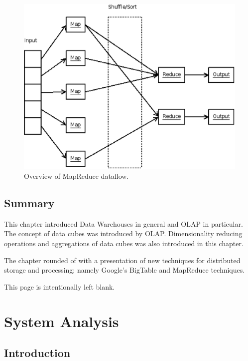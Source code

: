 \vspace{12pt}

\begin{figure}[h]
    \begin{center}
        \includegraphics[scale=0.50]{map-reduce.eps}
        \caption{Overview of MapReduce dataflow.}
    \end{center}
\end{figure}


\section*{Summary}

This chapter introduced Data Warehouses in general and OLAP in particular. The
concept of data cubes was introduced by OLAP. Dimensionality reducing operations
and aggregations of data cubes was also introduced in this chapter.

The chapter rounded of with a presentation of new techniques for distributed
storage and processing; namely Google's BigTable and MapReduce techniques.


\pagebreak
This page is intentionally left blank.
\pagebreak

\chapter{System Analysis}



\section*{Introduction}

